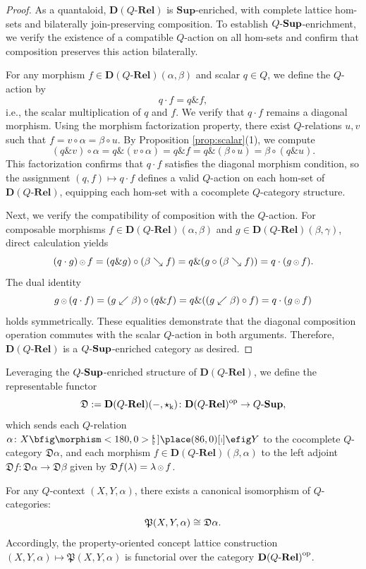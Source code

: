 \documentclass{tac}
\begin{document}
\begin{proof}
As a quantaloid, $\mathbf{D}(Q\text{-}\mathbf{Rel})$ is $\mathbf{Sup}$-enriched, with complete lattice hom-sets and bilaterally join-preserving composition. To establish ${Q\text{-}\mathbf{Sup}}$-enrichment, we verify the existence of a compatible $Q$-action on all hom-sets and confirm that composition preserves this action bilaterally.

For any morphism $f\in\mathbf{D}(Q\text{-}\mathbf{Rel})(\alpha,\beta)$ and scalar $q\in Q$, we define the $Q$-action by
\[
q\cdot f=q\& f,
\]
i.e., the scalar multiplication of $q$ and $f$. We verify that $q\cdot f$ remains a diagonal morphism. Using the morphism factorization property, there exist $Q$-relations $u,v$ such that $f=v\circ\alpha=\beta\circ u$. By Proposition \ref{prop:scalar}(1), we compute
\[
(q\& v)\circ\alpha=q\&(v\circ\alpha)=q\& f=q\&(\beta\circ u)=\beta\circ(q\& u).
\]
This factorization confirms that $q\cdot f$ satisfies the diagonal morphism condition, so the assignment $(q,f)\mapsto q\cdot f$ defines a valid $Q$-action on each hom-set of $\mathbf{D}(Q\text{-}\mathbf{Rel})$, equipping each hom-set with a cocomplete $Q$-category structure.

Next, we verify the compatibility of composition with the $Q$-action. For composable morphisms $f\in\mathbf{D}(Q\text{-}\mathbf{Rel})(\alpha,\beta)$ and $g\in\mathbf{D}(Q\text{-}\mathbf{Rel})(\beta,\gamma)$, direct calculation yields
\[
(q\cdot g){\,{\scriptstyle\odot}\,} f=(q\& g)\circ(\beta\searrow f)
=q\&(g\circ(\beta\searrow f))=q\cdot(g{\,{\scriptstyle\odot}\,} f).
\]
The dual identity
\[
g{\,{\scriptstyle\odot}\,}(q\cdot f)=(g\swarrow\beta)\circ(q\& f)
=q\&((g\swarrow\beta)\circ f)=q\cdot(g{\,{\scriptstyle\odot}\,} f)
\]
holds symmetrically. These equalities demonstrate that the diagonal composition operation commutes with the scalar $Q$-action in both arguments. Therefore, $\mathbf{D}(Q\text{-}\mathbf{Rel})$ is a ${Q\text{-}\mathbf{Sup}}$-enriched category as desired.
\end{proof}

Leveraging the ${Q\text{-}\mathbf{Sup}}$-enriched structure of $\mathbf{D}(Q\text{-}\mathbf{Rel})$, we define the representable functor
\[
\mathfrak{D}:=\mathbf{D}(Q\text{-}\mathbf{Rel})(-,\star_\mathrm{k})\colon\mathbf{D}(Q\text{-}\mathbf{Rel})^{\mathrm{op}}\to{Q\text{-}\mathbf{Sup}},
\]
which sends each $Q$-relation $\alpha\colon X\nto Y$ to the cocomplete $Q$-category $\mathfrak{D}\alpha$, and each morphism $f\in\mathbf{D}(Q\text{-}\mathbf{Rel})(\beta,\alpha)$ to the left adjoint $\mathfrak{D}f\colon\mathfrak{D}\alpha\to\mathfrak{D}\beta$ given by $\mathfrak{D}f(\lambda)=\lambda{\,{\scriptstyle\odot}\,} f$. 

\begin{theorem}
For any $Q$-context $(X,Y,\alpha)$, there exists a canonical isomorphism of $Q$-categories:
\[
\mathfrak{P}(X,Y,\alpha)\cong\mathfrak{D}\alpha.
\]
Accordingly, the property-oriented concept lattice construction $(X,Y,\alpha)\mapsto\mathfrak{P}(X,Y,\alpha)$ is functorial over the category ${\mathbf{D}(Q\text{-}\mathbf{Rel})}^{\mathrm{op}}$.
\end{theorem}
\end{document}

